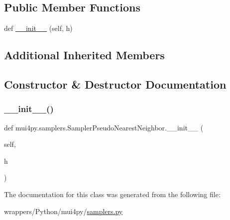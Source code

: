 \subsection*{Public Member Functions}
\begin{DoxyCompactItemize}
\item 
def \hyperlink{classmui4py_1_1samplers_1_1_sampler_pseudo_nearest_neighbor_aedfee78139150078d3b691b9f865d023}{\+\_\+\+\_\+init\+\_\+\+\_\+} (self, h)
\end{DoxyCompactItemize}
\subsection*{Additional Inherited Members}


\subsection{Constructor \& Destructor Documentation}
\mbox{\label{classmui4py_1_1samplers_1_1_sampler_pseudo_nearest_neighbor_aedfee78139150078d3b691b9f865d023}} 
\subsubsection{\texorpdfstring{\+\_\+\+\_\+init\+\_\+\+\_\+()}{\_\_init\_\_()}}
{\footnotesize\ttfamily def mui4py.\+samplers.\+Sampler\+Pseudo\+Nearest\+Neighbor.\+\_\+\+\_\+init\+\_\+\+\_\+ (\begin{DoxyParamCaption}\item[{}]{self,  }\item[{}]{h }\end{DoxyParamCaption})}



The documentation for this class was generated from the following file\+:\begin{DoxyCompactItemize}
\item 
wrappers/\+Python/mui4py/\hyperlink{samplers_8py}{samplers.\+py}\end{DoxyCompactItemize}
